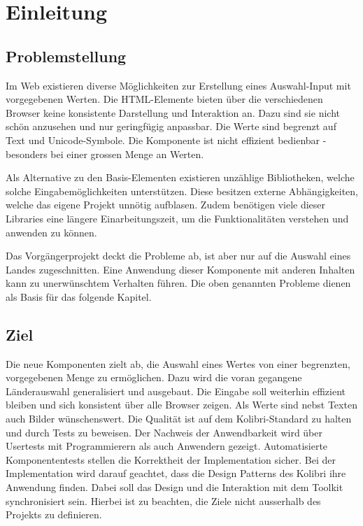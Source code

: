 \chapter{Einleitung}


\section{Problemstellung}

Im Web existieren diverse Möglichkeiten zur Erstellung eines Auswahl-Input mit vorgegebenen Werten.
Die HTML-Elemente bieten über die verschiedenen Browser keine konsistente Darstellung und Interaktion an.
Dazu sind sie nicht schön anzusehen und nur geringfügig anpassbar. 
Die Werte sind begrenzt auf Text und Unicode-Symbole.
Die Komponente ist nicht effizient bedienbar - besonders bei einer grossen Menge an Werten.

Als Alternative zu den Basis-Elementen existieren unzählige Bibliotheken, welche solche Eingabemöglichkeiten unterstützen.
Diese besitzen externe Abhängigkeiten, welche das eigene Projekt unnötig aufblasen.
Zudem benötigen viele dieser Libraries eine längere Einarbeitungszeit, um die Funktionalitäten verstehen und anwenden zu können.

Das Vorgängerprojekt deckt die Probleme ab, ist aber nur auf die Auswahl eines Landes zugeschnitten.
Eine Anwendung dieser Komponente mit anderen Inhalten kann zu unerwünschtem Verhalten führen.
Die oben genannten Probleme dienen als Basis für das folgende Kapitel.


\section{Ziel}

Die neue Komponenten zielt ab, die Auswahl eines Wertes von einer begrenzten, vorgegebenen Menge zu ermöglichen.
Dazu wird die voran gegangene Länderauswahl generalisiert und ausgebaut.
Die Eingabe soll weiterhin effizient bleiben und sich konsistent über alle Browser zeigen.
Als Werte sind nebst Texten auch Bilder wünschenswert.
Die Qualität ist auf dem Kolibri-Standard zu halten und durch Tests zu beweisen.
Der Nachweis der Anwendbarkeit wird über Usertests mit Programmierern als auch Anwendern gezeigt.
Automatisierte Komponententests stellen die Korrektheit der Implementation sicher.
Bei der Implementation wird darauf geachtet, dass die Design Patterns des Kolibri ihre Anwendung finden.
Dabei soll das Design und die Interaktion mit dem Toolkit synchronisiert sein.
Hierbei ist zu beachten, die Ziele nicht ausserhalb des Projekts zu definieren.


